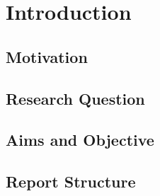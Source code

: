\chapter{Introduction}
\label{ch:introduction}

\lipsum[3]

\section{Motivation}

\lipsum[7]

\section{Research Question}

\lipsum[9]

\section{Aims and Objective}

\lipsum[8]

\section{Report Structure}

\lipsum[11]
